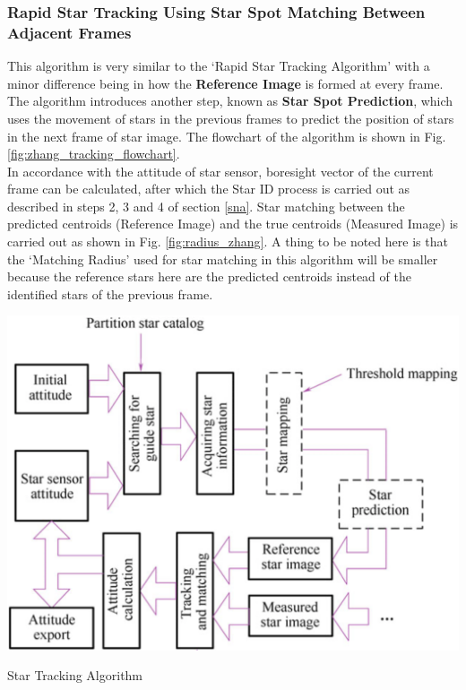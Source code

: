 \documentclass[../../main.tex]{subfiles}
\begin{document}
\subsubsection{Rapid Star Tracking Using Star Spot Matching Between Adjacent Frames} \label{zhang}
This algorithm is very similar to the `Rapid Star Tracking Algorithm' with a minor difference being in how the \textbf{Reference Image} is formed at every frame. The algorithm introduces another step, known as \textbf{Star Spot Prediction}, which uses the movement of stars in the previous frames to predict the position of stars in the next frame of star image. The flowchart of the algorithm is shown in Fig. \ref{fig:zhang_tracking_flowchart}.\\
In accordance with the attitude of star sensor, boresight vector of the current frame can be calculated, after which the Star ID process is carried out as described in steps 2, 3 and 4 of section \ref{sna}. 
Star matching between the predicted centroids (Reference Image) and the true centroids (Measured Image) is carried out as shown in Fig. \ref{fig:radius_zhang}. A thing to be noted here is that the `Matching Radius' used for star matching in this algorithm will be smaller because the reference stars here are the predicted centroids instead of the identified stars of the previous frame. 
\begin{Flowchart}
        \centering
        \includegraphics[scale=0.35]{Figures/GNC/zhang_tracking_flowchart.png}
        \caption{Star Tracking Algorithm}
        \label{fig:zhang_tracking_flowchart}
\end{Flowchart}
\end{document}
